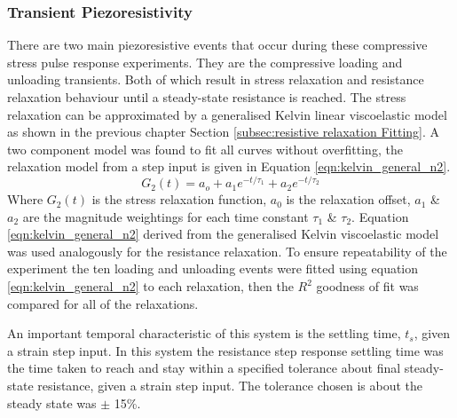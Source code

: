 \subsubsection{Transient Piezoresistivity}\label{sec:Transient Piezoresistivity}
There are two main piezoresistive events that occur during these compressive stress pulse response experiments. They are the compressive loading and unloading transients. Both of which result in stress relaxation and resistance relaxation behaviour until a steady-state resistance is reached. The stress relaxation can be approximated by a generalised Kelvin linear viscoelastic model \citep{Ju2022} as shown in the previous chapter Section \ref{subsec:resistive relaxation Fitting}. A two component model was found to fit all curves without overfitting, the relaxation model from a step input is given in Equation \ref{eqn:kelvin_general_n2}.
\begin{equation}
    G_2(t) = a_o + a_1 e^{-t/\tau_1} + a_2 e^{-t/\tau_2}
    \label{eqn:kelvin_general_n2}
\end{equation}
Where $G_2(t)$ is the stress relaxation function, $a_0$ is the relaxation offset, $a_1$ \& $a_2$ are the magnitude weightings for each time constant $\tau_1$ \& $\tau_2$. Equation \ref{eqn:kelvin_general_n2} derived from the generalised Kelvin viscoelastic model was used analogously for the resistance relaxation. %
To ensure repeatability of the experiment the ten loading and unloading events were fitted using equation \ref{eqn:kelvin_general_n2} to each relaxation, then the $R^2$ goodness of fit was compared for all of the relaxations.

An important temporal characteristic of this system is the settling time, $t_s$, given a strain step input. In this system the resistance step response settling time was the time taken to reach and stay within a specified tolerance about final steady-state resistance, given a strain step input. The tolerance chosen is about the steady state was $\pm$ 15\%. %

